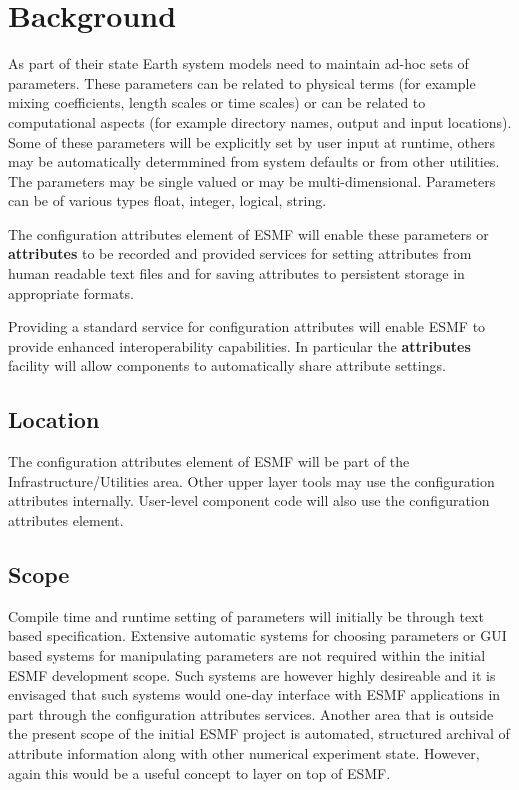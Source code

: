 
\section{Background}
As part of their state Earth system models need to maintain ad-hoc sets of
parameters. These parameters can be related to physical terms (for example
mixing coefficients, length scales or time scales) or can be related
to computational aspects (for example directory names, output and input
locations). Some of these parameters will be explicitly set by user
input at runtime, others may be automatically determmined from system
defaults or from other utilities. The parameters may be single valued
or may be multi-dimensional. Parameters can be of various types float,
integer, logical, string.

The configuration attributes element of ESMF will enable
these parameters or {\bf attributes} to be recorded and provided services
for setting attributes from human readable text files and for saving attributes
to persistent storage in appropriate formats.

Providing a standard service for configuration attributes will enable ESMF
to provide enhanced interoperability capabilities. In particular the
{\bf attributes} facility will allow components to automatically
share attribute settings.

\subsection{Location}

The configuration attributes element of ESMF will be part of the
Infrastructure/Utilities area. Other upper layer tools may use the
configuration attributes internally. User-level component code will
also use the configuration attributes element.

\subsection{Scope}

Compile time and runtime setting of parameters will initially be through
text based specification. Extensive automatic systems for choosing parameters or GUI
based systems for manipulating parameters are not required within the 
initial ESMF development scope. Such systems are however highly desireable
and it is envisaged that such systems would one-day interface with ESMF applications
in part through the configuration attributes services.
Another area that is outside the present scope of the initial ESMF project is automated,
structured archival of attribute information along with other numerical
experiment state. However, again this would be a useful concept to layer on
top of ESMF.

